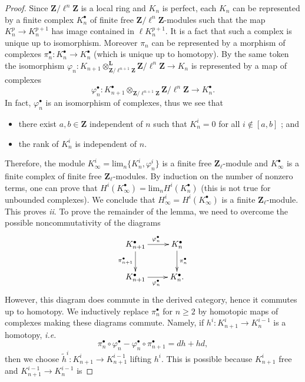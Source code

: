 \begin{proof}
Since $\mathbf{Z}/\ell^n\mathbf{Z}$ is a local ring and $K_n$ is perfect, each
$K_n$ can be represented by a finite complex $K_n^\bullet$ of finite free
$\mathbf{Z}/\ell^n \mathbf{Z}$-modules such that the map $K_n^p \to K_n^{p+1}$
has image contained in $\ell K_n^{p+1}$. It is a fact that such a complex is
unique up to isomorphism. Moreover $\pi_n$ can be represented by a morphism of
complexes $\pi_n^\bullet: K_n^\bullet\to K_n^\bullet$ (which is unique up to
homotopy). By the same token the isomorphism
$\varphi_n:K_{n+1}\otimes_{\mathbf{Z}/\ell^{n+1}\mathbf{Z}}^{\mathbf{L}}
\mathbf{Z}/\ell^n\mathbf{Z}\to K_n$ is represented by a map of complexes
$$
\varphi_n^\bullet:
K_{n+1}^\bullet\otimes_{\mathbf{Z}/\ell^{n+1}\mathbf{Z}}\mathbf{Z}/\ell^n\mathbf
{Z}\to K_n^\bullet.
$$
In fact, $\varphi_n^\bullet$ is an isomorphism of complexes, thus we see that
\begin{itemize}
\item
there exist $a, b\in \mathbf{Z}$ independent of $n$ such that $K_n^i = 0$ for
all $i\notin[a, b]$ ; and
\item
the rank of $K_n^i$ is independent of $n$.
\end{itemize}	
Therefore, the module $K_\infty^i = \text{lim}_n \{K_n^i, \varphi_n^i\}$ is a
finite free $\mathbf{Z}_\ell$-module and $K_\infty^\bullet$ is a finite complex
of finite free $\mathbf{Z}_\ell$-modules. By induction on the number of nonzero
terms, one can prove that $H^i\left(K_\infty^\bullet\right) = \text{lim}_n
H^i\left(K_n^\bullet\right)$ (this is not true for unbounded complexes). We
conclude that $H_\infty^i = H^i\left(K_\infty^\bullet\right)$ is a finite
$\mathbf{Z}_\ell$-module. This proves {\it ii}. To prove the remainder of the
lemma, we need to overcome the possible noncommutativity of the diagrams
$$
\xymatrix{
{K_{n+1}^\bullet} \ar_{\pi_{n+1}^\bullet}[d] \ar^{\varphi_n^\bullet}[r] &
{K_n^\bullet} \ar^{\pi_n^\bullet}[d] \\
{K_{n+1}^\bullet} \ar_{\varphi_n^\bullet}[r] & {K_n^\bullet.}
}
$$
However, this diagram does commute in the derived category, hence it commutes
up to homotopy. We inductively replace $\pi_n^\bullet$ for $n\geq 2$ by
homotopic maps of complexes making these diagrams commute. Namely, if $h^i:
K_{n+1}^i \to K_n^{i-1}$ is a homotopy, {\it i.e.}
$$
\pi_n^\bullet\circ\varphi_n^\bullet-\varphi_n^\bullet\circ\pi_{n+1}^\bullet =
dh+hd,
$$
then we choose $\tilde h^i: K_{n+1}^i\to K_{n+1}^{i-1}$ lifting $h^i$. This is
possible because $K_{n+1}^i$ free and $K_{n+1}^{i-1}\to K_n^{i-1}$ is

\end{proof}
